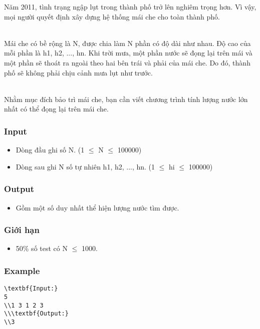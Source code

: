 



   Năm 2011, tình trạng ngập lụt trong thành phố trở lên nghiêm trọng hơn. Vì vậy, mọi người quyết định xây dựng hệ thống mái che cho toàn thành phố.  


\\   Mái che có bề rộng là N, được chia làm N phần có độ dài như nhau. Độ cao của mỗi phần là h1, h2, ..., hn. Khi trời mưa, một phần nước sẽ đọng lại trên mái và một phần sẽ thoát ra ngoài theo hai bên trái và phải của mái che. Do đó, thành phố sẽ không phải chịu cảnh mưa lụt như trước.  


\\   Nhằm mục đích bảo trì mái che, bạn cần viết chương trình tính lượng nước lớn nhất có thể đọng lại trên mái che.  

\subsubsection{   Input  }
\begin{itemize}
	\item     Dòng đầu ghi số N. (1  $\le$  N  $\le$  100000)   
\end{itemize}
\begin{itemize}
	\item     Dòng sau ghi N số tự nhiên h1, h2, ..., hn. (1  $\le$  hi  $\le$  100000)   
\end{itemize}

\subsubsection{   Output  }
\begin{itemize}
	\item     Gồm một số duy nhất thể hiện lượng nước tìm được.   
\end{itemize}

\subsubsection{   Giới hạn  }
\begin{itemize}
	\item     50\% số test có N  $\le$  1000.   
\end{itemize}

\subsubsection{   Example  }
\begin{verbatim}
\textbf{Input:}
5
\\1 3 1 2 3
\\\textbf{Output:}
\\3\end{verbatim}
